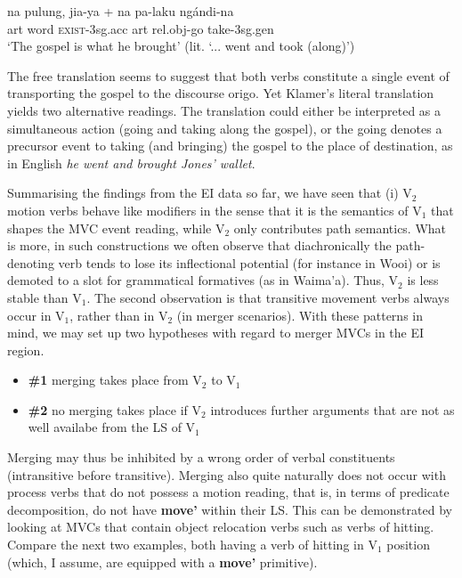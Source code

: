 \ea%
\gll na pulung, jia-ya + na pa-laku ngándi-na \\
\acs{art} word \textsc{exist}-3\acs{sg}.\acs{acc} \acs{art} \acs{rel}.\acs{obj}-go take-3\acs{sg}.\acs{gen} \\
\glft `The gospel is what he brought' (lit. `... went and took (along)') \ 
\z
\xe

The free translation seems to suggest that both verbs constitute a single event of transporting the gospel to the discourse origo. Yet Klamer's literal translation yields two alternative readings. The translation could either be interpreted as a simultaneous action (going and taking along the gospel), or the going denotes a precursor event to taking (and bringing) the gospel to the place of destination, as in English \textit{he went and brought Jones' wallet}.

Summarising the findings from the EI data so far, we have seen that (i) V$_2$ motion verbs behave like modifiers in the sense that it is the semantics of V$_1$ that shapes the MVC event reading, while V$_2$ only contributes path semantics. What is more, in such constructions we often observe that diachronically the path-denoting verb tends to lose its inflectional potential (for instance in Wooi) or is demoted to a slot for grammatical formatives (as in Waima'a). Thus, V$_2$ is less stable than V$_1$. The second observation is that transitive movement verbs always occur in V$_1$, rather than in V$_2$ (in merger scenarios). With these patterns in mind, we may set up two hypotheses with regard to merger MVCs in the EI region.

\begin{itemize}
\item \textbf{\#1} merging takes place from V$_2$ to V$_1$
\item \textbf{\#2} no merging takes place if V$_2$ introduces further arguments that are not as well availabe from the LS of V$_1$
\end{itemize}

Merging may thus be inhibited by a wrong order of verbal constituents (intransitive before transitive). Merging also quite naturally does not occur with process verbs that do not possess a motion reading, that is, in terms of predicate decomposition, do not have \textbf{move'} within their LS. This can be demonstrated by looking at MVCs that contain object relocation verbs such as verbs of hitting. Compare the next two examples, both having a verb of hitting in V$_1$ position (which, I assume, are equipped with a \textbf{move'} primitive).

